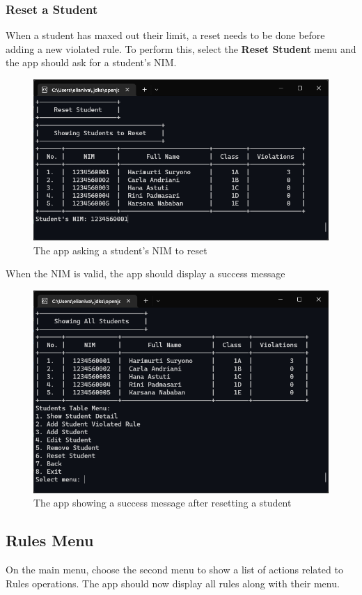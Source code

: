 \documentclass[12pt,titlepage]{article}
\begin{document}
\subsubsection{Reset a Student}
When a student has maxed out their limit, a reset needs to be done before adding a new violated rule.
To perform this, select the \textbf{Reset Student} menu and the app should ask for a student's NIM.

\begin{figure}[h]
    \centering
    \includegraphics[width=.8\textwidth]{images/reset-student-input.png}
    \caption{The app asking a student's NIM to reset}
\end{figure}

\pagebreak

When the NIM is valid, the app should display a success message

\begin{figure}[h]
    \centering
    \includegraphics[width=.8\textwidth]{images/reset-student-success.png}
    \caption{The app showing a success message after resetting a student}
\end{figure}

\pagebreak

\subsection{Rules Menu}
On the main menu, choose the second menu to show a list of actions related to Rules operations.
The app should now display all rules along with their menu.
\end{document}
